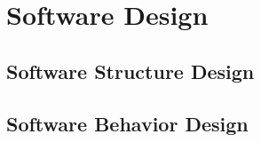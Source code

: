 \section{Software Design}


\subsection{Software Structure Design}


\subsection{Software Behavior Design}
